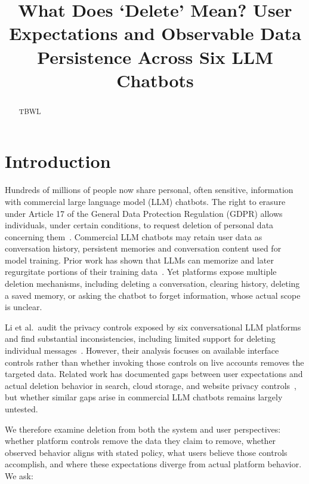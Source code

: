 \documentclass[conference,compsoc]{IEEEtran}
\title{What Does `Delete' Mean? User Expectations and Observable Data Persistence Across Six LLM Chatbots}
\author{\IEEEauthorblockN{Anonymous Author(s)}
\IEEEauthorblockA{Submission \#999}}
\begin{document}
\maketitle

\begin{abstract}
TBWL
\end{abstract}

\section{Introduction}
\label{sec:intro}

Hundreds of millions of people now share personal, often sensitive,
information with commercial large language model (LLM) chatbots. The
right to erasure under Article 17 of the General Data Protection
Regulation (GDPR) allows individuals, under certain conditions, to
request deletion of personal data concerning them~\cite{gdpr2016}.
Commercial LLM chatbots may retain user data as conversation history,
persistent memories and conversation content used for model
training. Prior work has shown that LLMs can memorize and later
regurgitate portions of their training data~\cite{carlini2021extracting}.
Yet platforms expose multiple deletion mechanisms, including deleting a
conversation, clearing history, deleting a saved memory, or asking the
chatbot to forget information, whose actual scope is unclear.

Li et al.\ audit the privacy controls exposed by six conversational LLM
platforms and find substantial inconsistencies, including limited support
for deleting individual messages~\cite{li2026privacy}. However, their
analysis focuses on available interface controls rather than whether
invoking those controls on live accounts removes the targeted data.
Related work has documented gaps between user expectations and actual
deletion behavior in search, cloud storage, and website privacy
controls~\cite{bertram2019five,kang2015mydata,ramokapane2017stupid,habib2019empirical},
but whether similar gaps arise in commercial LLM chatbots remains largely
untested.

We therefore examine deletion from both the system and user perspectives:
whether platform controls remove the data they claim to remove, whether
observed behavior aligns with stated policy, what users believe those
controls accomplish, and where these expectations diverge from actual
platform behavior. We ask:
\end{document}
